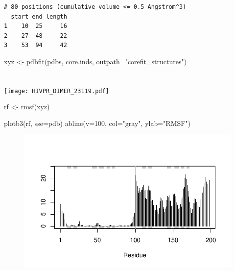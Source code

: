 \documentclass[
  letterpaper,
  DIV=11,
  numbers=noendperiod]{scrartcl}
\newenvironment{Shaded}{\begin{snugshade}}{\end{snugshade}}
\newcommand{\AttributeTok}[1]{\textcolor[rgb]{0.40,0.45,0.13}{#1}}
\newcommand{\DecValTok}[1]{\textcolor[rgb]{0.68,0.00,0.00}{#1}}
\newcommand{\FunctionTok}[1]{\textcolor[rgb]{0.28,0.35,0.67}{#1}}
\newcommand{\NormalTok}[1]{\textcolor[rgb]{0.00,0.23,0.31}{#1}}
\newcommand{\OtherTok}[1]{\textcolor[rgb]{0.00,0.23,0.31}{#1}}
\newcommand{\StringTok}[1]{\textcolor[rgb]{0.13,0.47,0.30}{#1}}
\begin{document}
\begin{verbatim}
# 80 positions (cumulative volume <= 0.5 Angstrom^3) 
  start end length
1    10  25     16
2    27  48     22
3    53  94     42
\end{verbatim}

\begin{Shaded}
\begin{Highlighting}[]
\NormalTok{xyz }\OtherTok{\textless{}{-}} \FunctionTok{pdbfit}\NormalTok{(pdbs, core.inds, }\AttributeTok{outpath=}\StringTok{"corefit\_structures"}\NormalTok{)}
\end{Highlighting}
\end{Shaded}

\hypertarget{section}{%
\section{}\label{section}}

\texttt{[image: HIVPR\_DIMER\_23119.pdf]}

\begin{Shaded}
\begin{Highlighting}[]
\NormalTok{rf }\OtherTok{\textless{}{-}} \FunctionTok{rmsf}\NormalTok{(xyz)}

\FunctionTok{plotb3}\NormalTok{(rf, }\AttributeTok{sse=}\NormalTok{pdb)}
\FunctionTok{abline}\NormalTok{(}\AttributeTok{v=}\DecValTok{100}\NormalTok{, }\AttributeTok{col=}\StringTok{"gray"}\NormalTok{, }\AttributeTok{ylab=}\StringTok{"RMSF"}\NormalTok{)}
\end{Highlighting}
\end{Shaded}

\begin{figure}[H]

{\centering \includegraphics{Class11INCLASS_files/figure-pdf/unnamed-chunk-25-1.pdf}

}

\end{figure}
\end{document}
